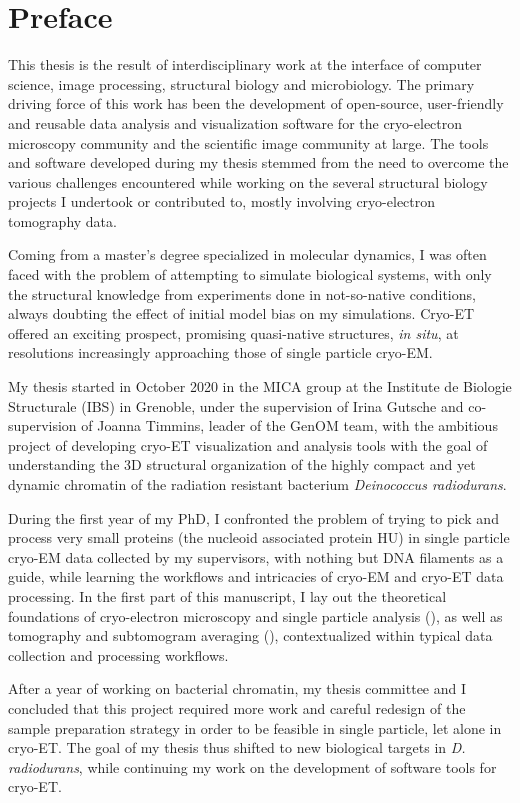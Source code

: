 \chapter{Preface}

This thesis is the result of interdisciplinary work at the interface of computer science, image processing, structural biology and microbiology.
The primary driving force of this work has been the development of open-source, user-friendly and reusable data analysis and visualization software for the cryo-electron microscopy community and the scientific image community at large.
The tools and software developed during my thesis stemmed from the need to overcome the various challenges encountered while working on the several structural biology projects I undertook or contributed to, mostly involving cryo-electron tomography data.

Coming from a master's degree specialized in molecular dynamics, I was often faced with the problem of attempting to simulate biological systems, with only the structural knowledge from experiments done in not-so-native conditions, always doubting the effect of initial model bias on my simulations.
Cryo-ET offered an exciting prospect, promising quasi-native structures, \textit{in situ}, at resolutions increasingly approaching those of single particle cryo-EM.

My thesis started in October 2020 in the MICA group at the Institute de Biologie Structurale (IBS) in Grenoble, under the supervision of Irina Gutsche and co-supervision of Joanna Timmins, leader of the GenOM team, with the ambitious project of developing cryo-ET visualization and analysis tools with the goal of understanding the 3D structural organization of the highly compact and yet dynamic chromatin of the radiation resistant bacterium \textit{Deinococcus radiodurans}.

During the first year of my PhD, I confronted the problem of trying to pick and process very small proteins (the nucleoid associated protein HU) in single particle cryo-EM data collected by my supervisors, with nothing but DNA filaments as a guide, while learning the workflows and intricacies of cryo-EM and cryo-ET data processing.
In the first part of this manuscript, I lay out the theoretical foundations of cryo-electron microscopy and single particle analysis (), as well as tomography and subtomogram averaging (), contextualized within typical data collection and processing workflows.

After a year of working on bacterial chromatin, my thesis committee and I concluded that this project required more work and careful redesign of the sample preparation strategy in order to be feasible in single particle, let alone in cryo-ET.
The goal of my thesis thus shifted to new biological targets in \textit{D. radiodurans}, while continuing my work on the development of software tools for cryo-ET.

